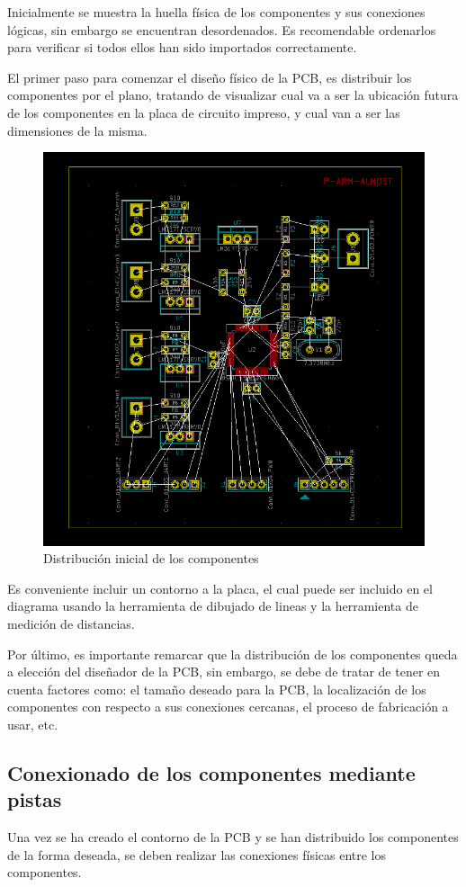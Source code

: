 Inicialmente se muestra la huella física de los componentes y sus conexiones lógicas, sin embargo se encuentran desordenados. Es recomendable ordenarlos para verificar si todos ellos han sido importados correctamente.

El primer paso para comenzar el diseño físico de la PCB, es distribuir los componentes por el plano, tratando de visualizar cual va a ser la ubicación futura de los componentes en la placa de circuito impreso, y cual van a ser las dimensiones de la misma.

\begin{figure}[H]
\centering 
\includegraphics[width=0.9\linewidth]{pictures/DistribucionInicial.PNG}
\caption{Distribución inicial de los componentes}
\label{fig:kdiagram}
\end{figure}

Es conveniente incluir un contorno a la placa, el cual puede ser incluido en el diagrama usando la herramienta de dibujado de lineas y la herramienta de medición de distancias.

Por último, es importante remarcar que la distribución de los componentes queda a elección del diseñador de la PCB, sin embargo, se debe de tratar de tener en cuenta factores como: el tamaño deseado para la PCB, la localización de los componentes con respecto a sus conexiones cercanas, el proceso de fabricación a usar, etc.

\subsection{Conexionado de los componentes mediante pistas}
Una vez se ha creado el contorno de la PCB y se han distribuido los componentes de la forma deseada, se deben realizar las conexiones físicas entre los componentes.

